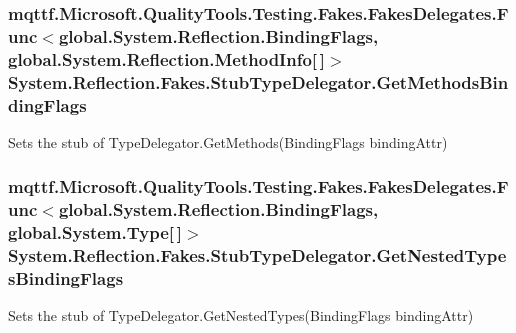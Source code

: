 \hypertarget{class_system_1_1_reflection_1_1_fakes_1_1_stub_type_delegator_a42a1e3413590712e4d226e0ab2af2fd3}{
\subsubsection[{Get\-Methods\-Binding\-Flags}]{\setlength{\rightskip}{0pt plus 5cm}mqttf.\-Microsoft.\-Quality\-Tools.\-Testing.\-Fakes.\-Fakes\-Delegates.\-Func$<$global.\-System.\-Reflection.\-Binding\-Flags, global.\-System.\-Reflection.\-Method\-Info\mbox{[}$\,$\mbox{]}$>$ System.\-Reflection.\-Fakes.\-Stub\-Type\-Delegator.\-Get\-Methods\-Binding\-Flags}}\label{class_system_1_1_reflection_1_1_fakes_1_1_stub_type_delegator_a42a1e3413590712e4d226e0ab2af2fd3}


Sets the stub of Type\-Delegator.\-Get\-Methods(\-Binding\-Flags binding\-Attr)

\hypertarget{class_system_1_1_reflection_1_1_fakes_1_1_stub_type_delegator_a661bb5314b7c0386354ee1eed237c690}{
\subsubsection[{Get\-Nested\-Types\-Binding\-Flags}]{\setlength{\rightskip}{0pt plus 5cm}mqttf.\-Microsoft.\-Quality\-Tools.\-Testing.\-Fakes.\-Fakes\-Delegates.\-Func$<$global.\-System.\-Reflection.\-Binding\-Flags, global.\-System.\-Type\mbox{[}$\,$\mbox{]}$>$ System.\-Reflection.\-Fakes.\-Stub\-Type\-Delegator.\-Get\-Nested\-Types\-Binding\-Flags}}\label{class_system_1_1_reflection_1_1_fakes_1_1_stub_type_delegator_a661bb5314b7c0386354ee1eed237c690}


Sets the stub of Type\-Delegator.\-Get\-Nested\-Types(\-Binding\-Flags binding\-Attr)

